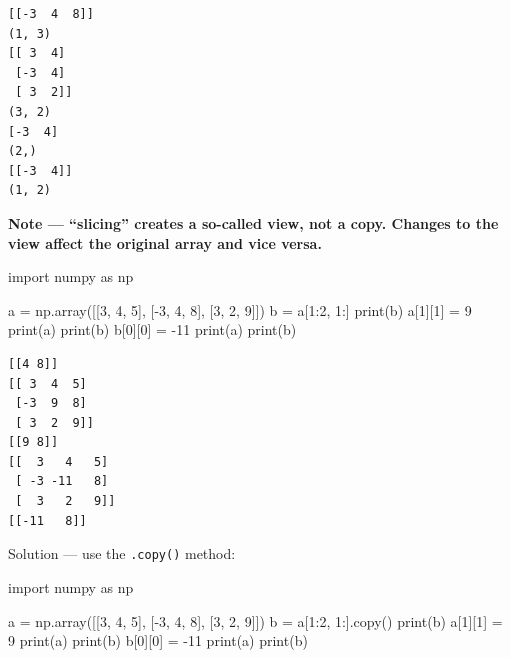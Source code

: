 \documentclass[
  english,
  letterpaper,
  DIV=11,
  numbers=noendperiod]{scrreprt}
\newenvironment{Shaded}{\begin{snugshade}}{\end{snugshade}}
\newcommand{\BuiltInTok}[1]{\textcolor[rgb]{0.00,0.23,0.31}{#1}}
\newcommand{\DecValTok}[1]{\textcolor[rgb]{0.68,0.00,0.00}{#1}}
\newcommand{\ImportTok}[1]{\textcolor[rgb]{0.00,0.46,0.62}{#1}}
\newcommand{\NormalTok}[1]{\textcolor[rgb]{0.00,0.23,0.31}{#1}}
\newcommand{\OperatorTok}[1]{\textcolor[rgb]{0.37,0.37,0.37}{#1}}
\begin{document}
\begin{verbatim}
[[-3  4  8]]
(1, 3)
[[ 3  4]
 [-3  4]
 [ 3  2]]
(3, 2)
[-3  4]
(2,)
[[-3  4]]
(1, 2)
\end{verbatim}

\textbf{Note --- ``slicing'' creates a so-called view, not a copy.
Changes to the view affect the original array and vice versa.}

\begin{Shaded}
\begin{Highlighting}[]
\ImportTok{import}\NormalTok{ numpy }\ImportTok{as}\NormalTok{ np}

\NormalTok{a }\OperatorTok{=}\NormalTok{ np.array([[}\DecValTok{3}\NormalTok{, }\DecValTok{4}\NormalTok{, }\DecValTok{5}\NormalTok{], [}\OperatorTok{{-}}\DecValTok{3}\NormalTok{, }\DecValTok{4}\NormalTok{, }\DecValTok{8}\NormalTok{], [}\DecValTok{3}\NormalTok{, }\DecValTok{2}\NormalTok{, }\DecValTok{9}\NormalTok{]])}
\NormalTok{b }\OperatorTok{=}\NormalTok{ a[}\DecValTok{1}\NormalTok{:}\DecValTok{2}\NormalTok{, }\DecValTok{1}\NormalTok{:]}
\BuiltInTok{print}\NormalTok{(b)}
\NormalTok{a[}\DecValTok{1}\NormalTok{][}\DecValTok{1}\NormalTok{] }\OperatorTok{=} \DecValTok{9}
\BuiltInTok{print}\NormalTok{(a)}
\BuiltInTok{print}\NormalTok{(b)}
\NormalTok{b[}\DecValTok{0}\NormalTok{][}\DecValTok{0}\NormalTok{] }\OperatorTok{=} \OperatorTok{{-}}\DecValTok{11}
\BuiltInTok{print}\NormalTok{(a)}
\BuiltInTok{print}\NormalTok{(b)}
\end{Highlighting}
\end{Shaded}

\begin{verbatim}
[[4 8]]
[[ 3  4  5]
 [-3  9  8]
 [ 3  2  9]]
[[9 8]]
[[  3   4   5]
 [ -3 -11   8]
 [  3   2   9]]
[[-11   8]]
\end{verbatim}

Solution --- use the \texttt{.copy()} method:

\begin{Shaded}
\begin{Highlighting}[]
\ImportTok{import}\NormalTok{ numpy }\ImportTok{as}\NormalTok{ np}

\NormalTok{a }\OperatorTok{=}\NormalTok{ np.array([[}\DecValTok{3}\NormalTok{, }\DecValTok{4}\NormalTok{, }\DecValTok{5}\NormalTok{], [}\OperatorTok{{-}}\DecValTok{3}\NormalTok{, }\DecValTok{4}\NormalTok{, }\DecValTok{8}\NormalTok{], [}\DecValTok{3}\NormalTok{, }\DecValTok{2}\NormalTok{, }\DecValTok{9}\NormalTok{]])}
\NormalTok{b }\OperatorTok{=}\NormalTok{ a[}\DecValTok{1}\NormalTok{:}\DecValTok{2}\NormalTok{, }\DecValTok{1}\NormalTok{:].copy()}
\BuiltInTok{print}\NormalTok{(b)}
\NormalTok{a[}\DecValTok{1}\NormalTok{][}\DecValTok{1}\NormalTok{] }\OperatorTok{=} \DecValTok{9}
\BuiltInTok{print}\NormalTok{(a)}
\BuiltInTok{print}\NormalTok{(b)}
\NormalTok{b[}\DecValTok{0}\NormalTok{][}\DecValTok{0}\NormalTok{] }\OperatorTok{=} \OperatorTok{{-}}\DecValTok{11}
\BuiltInTok{print}\NormalTok{(a)}
\BuiltInTok{print}\NormalTok{(b)}
\end{Highlighting}
\end{Shaded}
\end{document}
